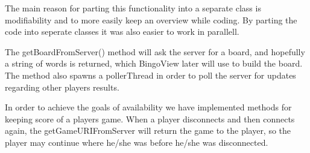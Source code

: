 The main reason for parting this functionality into a separate class is modifiability and to more easily keep an overview while coding. By parting the code into seperate classes it was also easier to work in parallell. 

The getBoardFromServer() method will ask the server for a board, and hopefully a string of words is returned, which BingoView later will use to build the board. The method also spawns a pollerThread in order to poll the server for updates regarding other players results.

In order to achieve the goals of availability we have implemented methods for keeping score of a players game. When a player disconnects and then connects again, the getGameURIFromServer will return the game to the player, so the player may continue where he/she was before he/she was disconnected. 